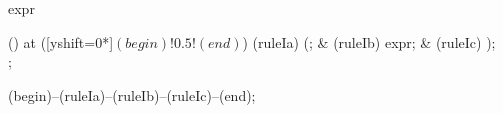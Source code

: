 \begin{syntax}{expr}
  
  \node[sequence] () at ([yshift=0*\syntaxruledist]$(begin)!0.5!(end)$) {
    \node[terminal]    (ruleIa) {(};
    &
    \node[nonterminal] (ruleIb) {expr};
    &
    \node[terminal]    (ruleIc) {)};
    \\
  };
  
  \draw[path] (begin)--(ruleIa)--(ruleIb)--(ruleIc)--(end);
\end{syntax}
